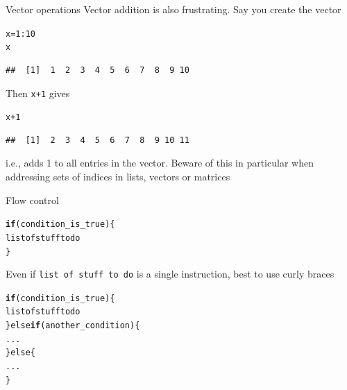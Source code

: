 \documentclass[aspectratio=169]{beamer}\usepackage[]{graphicx}\usepackage[]{xcolor}
\makeatletter
\newcommand{\hlnum}[1]{\textcolor[rgb]{0.686,0.059,0.569}{#1}}%
\newcommand{\hlopt}[1]{\textcolor[rgb]{0,0,0}{#1}}%
\newcommand{\hldef}[1]{\textcolor[rgb]{0.345,0.345,0.345}{#1}}%
\newcommand{\hlkwb}[1]{\textcolor[rgb]{0.69,0.353,0.396}{#1}}%
\newcommand{\hlkwd}[1]{\textcolor[rgb]{0.737,0.353,0.396}{\textbf{#1}}}%
\newenvironment{kframe}{%
 \def\at@end@of@kframe{}%
 \ifinner\ifhmode%
  \def\at@end@of@kframe{\end{minipage}}%
  \begin{minipage}{\columnwidth}%
 \fi\fi%
 \def\FrameCommand##1{\hskip\@totalleftmargin \hskip-\fboxsep
 \colorbox{shadecolor}{##1}\hskip-\fboxsep
     \hskip-\linewidth \hskip-\@totalleftmargin \hskip\columnwidth}%
 \MakeFramed {\advance\hsize-\width
   \@totalleftmargin\z@ \linewidth\hsize
   \@setminipage}}%
 {\par\unskip\endMakeFramed%
 \at@end@of@kframe}
\newenvironment{knitrout}{}{} %
\makeatother
\begin{document}
\begin{frame}[fragile]{Vector operations}
Vector addition is also frustrating. Say you create the vector
\begin{knitrout}
\color{fgcolor}\begin{kframe}
\begin{alltt}
\hldef{x} \hlkwb{=} \hlnum{1}\hlopt{:}\hlnum{10}
\hldef{x}
\end{alltt}
\begin{verbatim}
##  [1]  1  2  3  4  5  6  7  8  9 10
\end{verbatim}
\end{kframe}
\end{knitrout}

Then \texttt{x+1} gives
\begin{knitrout}
\color{fgcolor}\begin{kframe}
\begin{alltt}
\hldef{x}\hlopt{+}\hlnum{1}
\end{alltt}
\begin{verbatim}
##  [1]  2  3  4  5  6  7  8  9 10 11
\end{verbatim}
\end{kframe}
\end{knitrout}

i.e., adds 1 to all entries in the vector.
Beware of this in particular when addressing sets of indices in lists, vectors or matrices
\end{frame}

\begin{frame}[fragile]{Flow control}
\begin{knitrout}
\color{fgcolor}\begin{kframe}
\begin{alltt}
\hlkwd{if} (condition_is_true) \{
  list of stuff to do
\}
\end{alltt}
\end{kframe}
\end{knitrout}

Even if \texttt{list of stuff to do} is a single instruction, best to use curly braces

\begin{knitrout}
\color{fgcolor}\begin{kframe}
\begin{alltt}
\hlkwd{if} (condition_is_true) \{
  list of stuff to do
\} else \hlkwd{if} (another_condition) \{
  ...
\} else \{
  ...
\}
\end{alltt}
\end{kframe}
\end{knitrout}
\end{frame}
\end{document}

